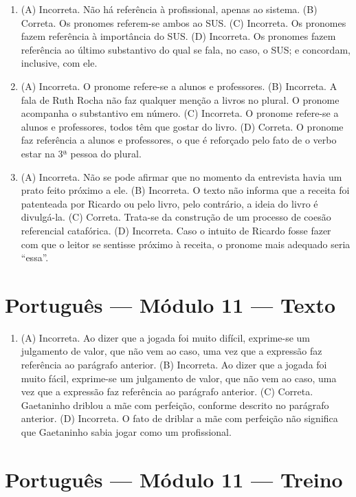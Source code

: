 \begin{enumerate}
\item (A) Incorreta. Não há referência à profissional, apenas ao sistema.
(B) Correta. Os pronomes referem-se ambos ao SUS.
(C) Incorreta. Os pronomes fazem referência à importância do SUS.
(D) Incorreta. Os pronomes fazem referência ao último substantivo do qual
se fala, no caso, o SUS; e concordam, inclusive, com ele.

\item (A) Incorreta. O pronome refere-se a alunos e professores.
(B) Incorreta. A fala de Ruth Rocha não faz qualquer menção a livros no
plural. O pronome acompanha o substantivo em número.
(C) Incorreta. O pronome refere-se a alunos e professores, todos têm que
gostar do livro.
(D) Correta. O pronome faz referência a alunos e professores, o que é
reforçado pelo fato de o verbo estar na 3ª pessoa do plural.

\item (A) Incorreta. Não se pode afirmar que no momento da entrevista havia um
prato feito próximo a ele.
(B) Incorreta. O texto não informa que a receita foi patenteada por
Ricardo ou pelo livro, pelo contrário, a ideia do livro é divulgá-la.
(C) Correta. Trata-se da construção de um processo de coesão referencial
catafórica.
(D) Incorreta. Caso o intuito de Ricardo fosse fazer com que o leitor se
sentisse próximo à receita, o pronome mais adequado seria ``essa''.
\end{enumerate}

\section*{Português — Módulo 11 — Texto}

\begin{enumerate}
\item (A) Incorreta. Ao dizer que a jogada foi muito difícil, exprime-se um
julgamento de valor, que não vem ao caso, uma vez que a expressão faz
referência ao parágrafo anterior.
(B) Incorreta. Ao dizer que a jogada foi muito fácil, exprime-se um
julgamento de valor, que não vem ao caso, uma vez que a expressão faz
referência ao parágrafo anterior.
(C) Correta. Gaetaninho driblou a mãe com perfeição, conforme descrito
no parágrafo anterior.
(D) Incorreta. O fato de driblar a mãe com perfeição não significa que
Gaetaninho sabia jogar como um profissional.
\end{enumerate}

\section*{Português — Módulo 11 — Treino}


